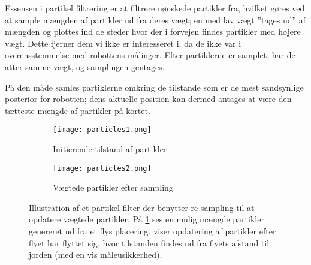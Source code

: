 Essensen i partikel filtrering er at filtrere uønskede partikler fra, hvilket gøres ved at sample mængden af partikler ud fra deres vægt; en med lav vægt ''tages ud'' af mængden og plottes ind de steder hvor der i forvejen findes partikler med højere vægt.
Dette fjerner dem vi ikke er interesseret i, da de ikke var i overensstemmelse med robottens målinger.
Efter partiklerne er samplet, har de atter samme vægt, og samplingen gentages.

På den måde samles partiklerne omkring de tilstande som er de mest sandsynlige posterior for robotten; dens aktuelle position kan dermed antages at være den tætteste mængde af partikler på kortet.

\begin{figure}[h] %
\centering
	\begin{subfigure}[b]{.45\textwidth}
	\centering
	\texttt{[image: particles1.png]}
	\caption{Initierende tilstand af partikler}
	\label{map:particles1}
	\end{subfigure}\hspace{1em}
	\begin{subfigure}[b]{.45\textwidth}
	\centering
	\texttt{[image: particles2.png]}
	\caption{Vægtede partikler efter sampling}
	\label{map:particles2}
	\end{subfigure}
\caption{Illustration af et partikel filter der benytter re-sampling til at opdatere vægtede partikler. 
På \cref{map:particles1} ses en mulig mængde partikler genereret ud fra et flys placering.
 viser opdatering af partikler efter flyet har flyttet sig, hvor tilstanden findes ud fra flyets afstand til jorden (med en vis måleusikkerhed).}
\label{map:particles}
\end{figure}

